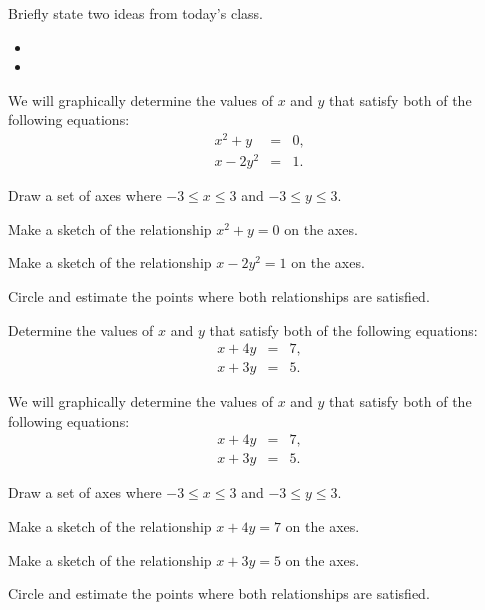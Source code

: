 \begin{problem}
\item Briefly state two ideas from today's class.
  \begin{itemize}
  \item
  \item
  \end{itemize}
\item We will graphically determine the values of $x$ and $y$ that
  satisfy both of the following equations:
  \begin{eqnarray*}
    x^2 + y  & = & 0, \\
    x - 2y^2 & = & 1.
  \end{eqnarray*}

  \begin{subproblem}
  \item Draw a set of axes where $-3\leq x \leq 3$ and $-3 \leq y \leq
    3$.


    \vfill

  \item Make a sketch of the relationship $x^2+y=0$ on the axes.
  \item Make a sketch of the relationship $x-2y^2=1$ on the axes.
  \item Circle and estimate the points where both relationships are
    satisfied.
  \end{subproblem}
\clearpage
\item Determine the values of $x$ and $y$ that satisfy both of the
  following equations:
  \begin{eqnarray*}
    x + 4y & = & 7, \\
    x + 3y & = & 5.
  \end{eqnarray*}
  \clearpage
\item We will graphically determine the values of $x$ and $y$ that
  satisfy both of the following equations:
  \begin{eqnarray*}
    x + 4y & = & 7, \\
    x + 3y & = & 5.
  \end{eqnarray*}
  \begin{subproblem}
  \item Draw a set of axes where $-3\leq x \leq 3$ and $-3 \leq y \leq
    3$.


    \vfill

  \item Make a sketch of the relationship $x+4y=7$ on the axes.
  \item Make a sketch of the relationship $x+3y=5$ on the axes.
  \item Circle and estimate the points where both relationships are
    satisfied.
  \end{subproblem}
\end{problem}


